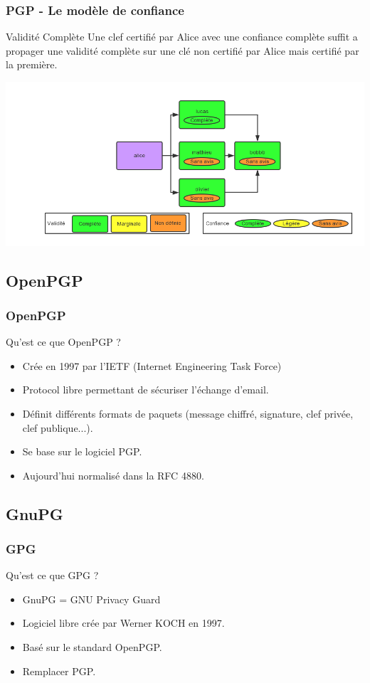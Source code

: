 \begin{frame}
  \frametitle{\color{white}PGP - Le modèle de confiance}
    \begin{block}{Validité Complète}
      Une clef certifié par Alice avec une confiance complète
      suffit a propager une validité complète sur une clé non certifié par Alice mais
      certifié par la première.
    \end{block}
    \includegraphics[scale=0.3]{tdcdemoComplete2.png}
\end{frame}

\subsection{OpenPGP}
\begin{frame}
    \frametitle{\color{white}OpenPGP}
    \begin{block}{Qu'est ce que OpenPGP ?}
    	\begin{itemize}
    	 \item Crée en 1997 par l'IETF (Internet Engineering Task Force)
    	 \item Protocol libre permettant de sécuriser l'échange d'email.
    	 \item Définit différents formats de paquets (message chiffré, signature, clef privée, clef publique...).
    	 \item Se base sur le logiciel PGP.
         \item Aujourd'hui normalisé dans la RFC 4880.
       \end{itemize} 
    \end{block}
\end{frame}

\subsection{GnuPG}
\begin{frame}
    \frametitle{\color{white}GPG}
    \begin{block}{Qu'est ce que GPG ?}
      \begin{itemize}
        \item GnuPG = GNU Privacy Guard
        \item Logiciel libre crée par Werner KOCH en 1997.
        \item Basé sur le standard OpenPGP.
        \item Remplacer PGP.
      \end{itemize}
    \end{block}
\end{frame}